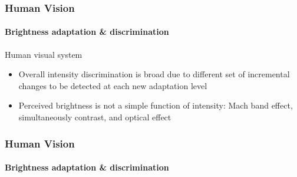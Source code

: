 \documentclass[table]{beamer}
\begin{document}
\begin{frame}
  \frametitle{Human Vision}
  \framesubtitle{Brightness adaptation \& discrimination}
  \begin{block}{Human visual system}
    \begin{itemize}\scriptsize
    \item Overall intensity discrimination is broad due to different set of incremental changes to be detected at each new adaptation level
    \item Perceived brightness is not a simple function of intensity: Mach band effect, simultaneously contrast, and optical effect
    \end{itemize}
  \end{block}
\end{frame}

\begin{frame}
  \frametitle{Human Vision}
  \framesubtitle{Brightness adaptation \& discrimination}

\end{frame}
\end{document}
